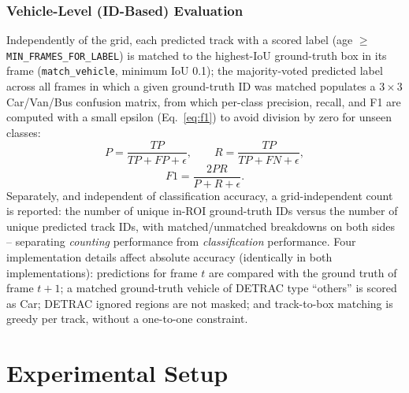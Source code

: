 \documentclass[conference]{IEEEtran}
\newcommand{\code}[1]{\texttt{#1}}
\begin{document}
\subsubsection{Vehicle-Level (ID-Based) Evaluation}
Independently of the grid, each predicted track with a scored label
(age $\geq$ \code{MIN\_FRAMES\_FOR\_LABEL}) is matched to the
highest-IoU ground-truth box in its frame (\code{match\_vehicle},
minimum IoU 0.1); the majority-voted predicted label across all frames
in which a given ground-truth ID was matched populates a
$3\times3$ Car/Van/Bus confusion matrix, from which per-class precision,
recall, and F1 are computed with a small epsilon (Eq.~\eqref{eq:f1}) to
avoid division by zero for unseen classes:
\begin{equation}
P = \frac{TP}{TP+FP+\epsilon},\qquad
R = \frac{TP}{TP+FN+\epsilon},
\label{eq:f1}
\end{equation}
\begin{equation}
F1 = \frac{2PR}{P+R+\epsilon}.
\label{eq:f1b}
\end{equation}
Separately, and independent of classification accuracy, a
grid-independent count is reported: the number of unique in-ROI
ground-truth IDs versus the number of unique predicted track IDs, with
matched/unmatched breakdowns on both sides -- separating \emph{counting}
performance from \emph{classification} performance. Four implementation
details affect absolute accuracy (identically in both implementations):
predictions for frame $t$ are compared with the ground truth of frame
$t{+}1$; a matched ground-truth vehicle of DETRAC type ``others'' is
scored as Car; DETRAC ignored regions are not masked; and track-to-box
matching is greedy per track, without a one-to-one constraint.

\section{Experimental Setup}
\label{sec:experiments}
\end{document}

